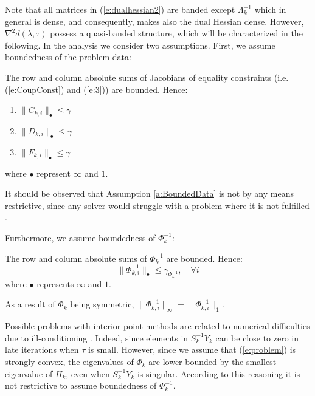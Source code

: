 Note that all matrices in (\ref{e:dualhessian2}) are banded except $\Lambda_k^{-1}$ which in general is dense, and consequently, makes also the dual Hessian dense. However, $\nabla^2 d(\lambda,\tau)$ possess a quasi-banded structure, which will be characterized in the following. In the analysis we consider two assumptions. First, we assume boundedness of the problem data:
\begin{assumption} \label{a:BoundedData}
The row and column absolute sums of Jacobians of equality constraints (i.e. (\ref{e:CoupConst}) and (\ref{e:3})) are bounded. Hence:
\begin{enumerate}
\item $\| C_{k,i} \|_\bullet \leq \gamma$
\item $\| D_{k,i} \|_\bullet \leq \gamma$
\item $\| F_{k,i} \|_\bullet \leq \gamma$
\end{enumerate}
where $\bullet$ represent $\infty$ and $1$.
\end{assumption}
\begin{remark}
It should be observed that Assumption \ref{a:BoundedData} is not by any means restrictive, since any solver would struggle with a problem where it is not fulfilled \cite{}. 
\end{remark}
Furthermore, we assume boundedness of $\Phi_k^{-1}$:
\begin{assumption} \label{a:BoundedConditioning}
The row and column absolute sums of $\Phi_k^{-1}$ are bounded. Hence:
\begin{equation}
\| \Phi_{k,i}^{-1} \|_\bullet \leq \gamma_{\Phi_k^{-1}}, \quad \forall i
\end{equation}
where $\bullet$ represents $\infty$ and $1$.
\end{assumption}
\begin{remark}
As a result of $\Phi_k$ being symmetric, $\| \Phi_{k,i}^{-1} \|_\infty = \| \Phi_{k,i}^{-1} \|_1$.
\end{remark}
\begin{remark}
Possible problems with interior-point methods are related to numerical difficulties due to ill-conditioning \cite{WrightM1998}. Indeed, since elements in $S_k^{-1}Y_k$ can be close to zero in late iterations when $\tau$ is small. However, since we assume that (\ref{e:problem}) is strongly convex, the eigenvalues of $\Phi_k$ are lower bounded by the smallest eigenvalue of $H_k$, even when $S_k^{-1}Y_k$ is singular. According to this reasoning it is not restrictive to assume boundedness of $\Phi_k^{-1}$.
\end{remark}


